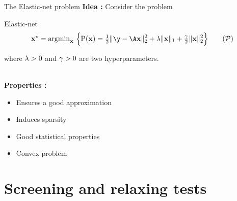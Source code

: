 \documentclass[10pt]{beamer}
\begin{document}
\begin{frame}{The Elastic-net problem}
  \textbf{Idea :} Consider the problem
  \begin{block}{Elastic-net}
    \begin{equation}
      \label{prob:primal}
      \pvopt = \argmin_{\pv} \ 
      \Big\{
      \pfunc(\pv) = 
        \tfrac{1}{2}\norm{\obs-\dic\pv}{2}^2
        + \regone \norm{\pv}{1}
        + \tfrac{\regtwo}{2} \norm{\pv}{2}^2
      \Big\}
      \tag{$\ppb$}
    \end{equation}
  \end{block}  
  where $\lambda>0$ and $\gamma>0$ are two hyperparameters. \\~\\

  \pause

  \textbf{Properties :}
  \begin{itemize}
    \item Ensures a good approximation
    \item Induces sparsity
    \item Good statistical properties
    \item Convex problem
  \end{itemize}
\end{frame}

\section{Screening and relaxing tests}
\end{document}
